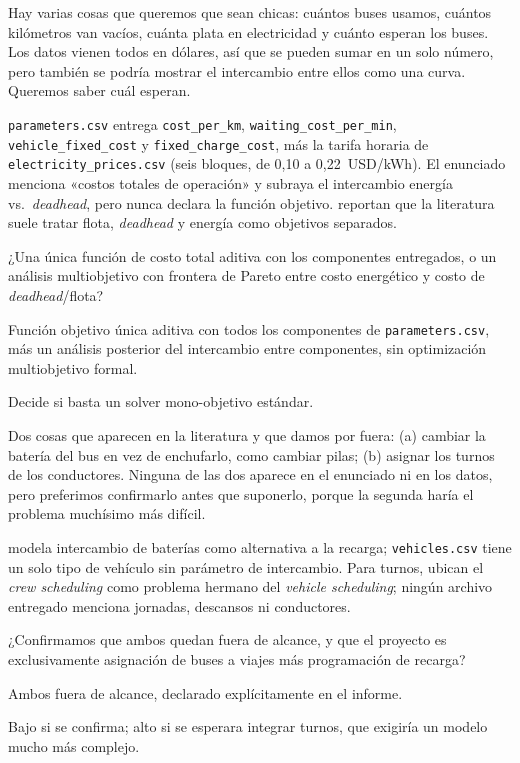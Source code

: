 \documentclass[11pt,a4paper,parskip=half]{scrartcl}
\begin{document}
\begin{campos}
\item[En simple] Hay varias cosas que queremos que sean chicas: cuántos buses usamos, cuántos kilómetros van vacíos, cuánta plata en electricidad y cuánto esperan los buses. Los datos vienen todos en dólares, así que se pueden sumar en un solo número, pero también se podría mostrar el intercambio entre ellos como una curva. Queremos saber cuál esperan.
\item[Evidencia] \texttt{parameters.csv} entrega \texttt{cost\_per\_km}, \texttt{waiting\_cost\_per\_min}, \texttt{vehicle\_fixed\_cost} y \texttt{fixed\_charge\_cost}, más la tarifa horaria de \texttt{electricity\_prices.csv} (seis bloques, de 0{,}10 a 0{,}22~USD/kWh). El enunciado menciona «costos totales de operación» y subraya el intercambio energía vs.\ \textit{deadhead}, pero nunca declara la función objetivo. \citet{perumal_evspreview_2022} reportan que la literatura suele tratar flota, \textit{deadhead} y energía como objetivos separados.
\item[Pregunta] ¿Una única función de costo total aditiva con los componentes entregados, o un análisis multiobjetivo con frontera de Pareto entre costo energético y costo de \textit{deadhead}/flota?
\item[Supuesto] Función objetivo única aditiva con todos los componentes de \texttt{parameters.csv}, más un análisis posterior del intercambio entre componentes, sin optimización multiobjetivo formal.
\item[Impacto] Decide si basta un solver mono-objetivo estándar.
\end{campos}

\begin{campos}
\item[En simple] Dos cosas que aparecen en la literatura y que damos por fuera: (a) cambiar la batería del bus en vez de enchufarlo, como cambiar pilas; (b) asignar los turnos de los conductores. Ninguna de las dos aparece en el enunciado ni en los datos, pero preferimos confirmarlo antes que suponerlo, porque la segunda haría el problema muchísimo más difícil.
\item[Evidencia] \citet{li_limitedenergy_2014} modela intercambio de baterías como alternativa a la recarga; \texttt{vehicles.csv} tiene un solo tipo de vehículo sin parámetro de intercambio. Para turnos, \citet{desaulniers_publictransit_2007} ubican el \textit{crew scheduling} como problema hermano del \textit{vehicle scheduling}; ningún archivo entregado menciona jornadas, descansos ni conductores.
\item[Pregunta] ¿Confirmamos que ambos quedan fuera de alcance, y que el proyecto es exclusivamente asignación de buses a viajes más programación de recarga?
\item[Supuesto] Ambos fuera de alcance, declarado explícitamente en el informe.
\item[Impacto] Bajo si se confirma; alto si se esperara integrar turnos, que exigiría un modelo mucho más complejo.
\end{campos}
\end{document}
